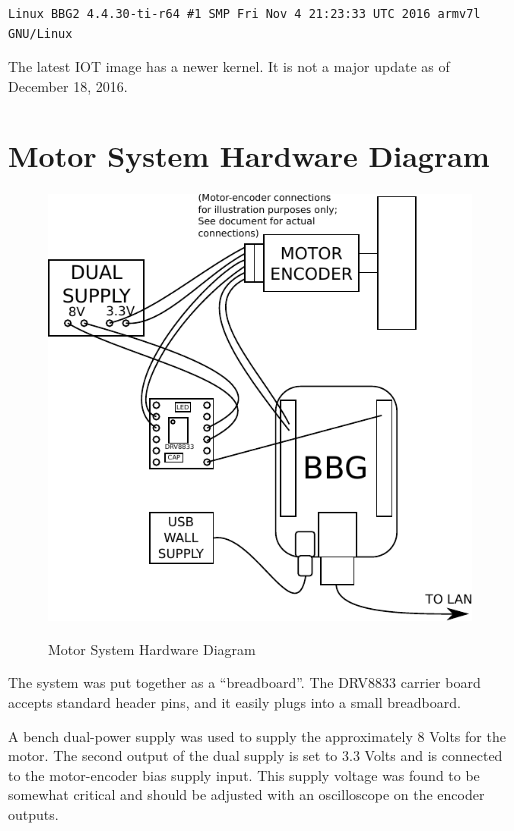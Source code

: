 \begin{verbatim}
Linux BBG2 4.4.30-ti-r64 #1 SMP Fri Nov 4 21:23:33 UTC 2016 armv7l GNU/Linux
\end{verbatim}

The latest IOT image has a newer kernel.  It is not a major update as of December 18, 2016.

\section{Motor System Hardware Diagram}

\begin{figure}[H]
	\centering
	\includegraphics[width=1.0\textwidth]{diagrams/motor_system}
	\centering\bfseries
	\caption{Motor System Hardware Diagram}
\end{figure}

The system was put together as a ``breadboard''.  The DRV8833 carrier board accepts standard header pins, and it easily plugs into a small breadboard.

A bench dual-power supply was used to supply the approximately 8 Volts for the motor.  The second output of the dual supply is set to 3.3 Volts and is connected to the motor-encoder bias supply input.  This supply voltage was found to be somewhat critical and should be adjusted with an oscilloscope on the encoder outputs.

